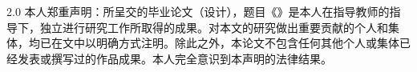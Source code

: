 \newpage

\centerline{\heiti{}}

\vskip 3cm

\begin{spacing}{2.0}
	本人郑重声明：所呈交的毕业论文（设计），题目《\ThesisTitle》是本人在指导教师的指导下，独立进行研究工作所取得的成果。对本文的研究做出重要贡献的个人和集体，均已在文中以明确方式注明。除此之外，本论文不包含任何其他个人或集体已经发表或撰写过的作品成果。本人完全意识到本声明的法律结果。

	\vskip 3cm

	{}
\end{spacing}
